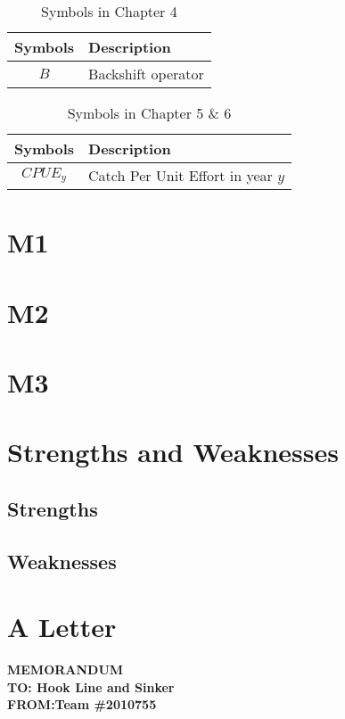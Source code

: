 \documentclass{mcmthesis}
\begin{document}
\begin{table}[htbp]
\centering
\caption{Symbols in Chapter 4}
\begin{tabular}{cp{}}
\toprule
 Symbols & Description\\
\midrule
$B$ &  Backshift operator\\

\bottomrule
\end{tabular}
\end{table}
\begin{table}[htbp]
\centering
\caption{Symbols in Chapter 5 \& 6}
\begin{tabular}{cp{}}
\toprule
 Symbols & Description\\
\midrule
$CPUE_{y}$ & Catch Per Unit Effort in year $y$\\

\bottomrule
\end{tabular}
\end{table}





\section{M1}

\section{M2}

\section{M3}




\section{Strengths and Weaknesses}
\subsection{Strengths}



\subsection{Weaknesses}


\section{A Letter}
\textbf{MEMORANDUM}~\\
\textbf{TO: Hook Line and Sinker}\\
\textbf{FROM:Team \#2010755}\\
\end{document}
